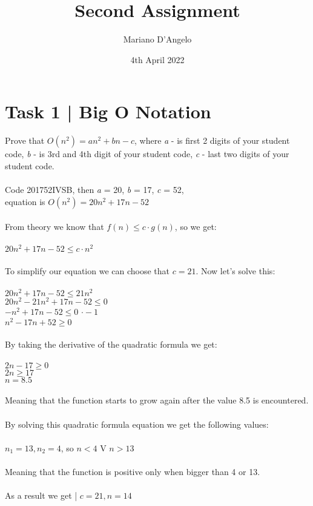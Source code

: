 \documentclass{article}
\title{Second Assignment}
\author{Mariano D'Angelo}
\date{4th April 2022}
\begin{document}
\maketitle


\section*{Task 1 | Big O Notation}
Prove that $O(n^2)= an^2 + bn - c$, where \textit{a} - is first 2 digits of your student
code, \textit{b} - is 3rd and 4th digit of your student code, \textit{c} - last 
two digits of your student code. \\\\
Code 201752IVSB, then \textit{a} = 20, \textit{b} = 17, \textit{c} = 52, \\
equation is $O(n^2) = 20n^2 + 17n - 52$ \\\\
From theory we know that $f(n) \le c \cdot g(n)$, so we get: \\\\
$20n^2 + 17n - 52 \le c \cdot n^2$ \\\\
To simplify our equation we can choose that $c = 21$. Now let's solve this:\\\\
$20n^2 + 17n - 52 \le 21n^2$ \\
$20n^2 - 21n^2 + 17n - 52 \le 0$ \\
$- n^2 + 17n - 52 \le 0$ \textbar{} $\cdot -1$\\
$n^2 - 17n + 52 \ge 0$ \\\\
By taking the derivative of the quadratic formula we get: \\\\
$2n - 17 \ge 0$ \\
$2n \ge 17$ \\
$n = 8.5$ \\\\
Meaning that the function starts to grow again after the value 8.5 is encountered. \\\\
By solving this quadratic formula equation we get the following values: \\\\
$n_1 = 13, n_2 = 4$, so $n < 4$ V $n > 13$ \\\\
Meaning that the function is positive only when bigger than 4 or 13. \\\\
As a result we get | $c = 21, n = 14$
\end{document}
